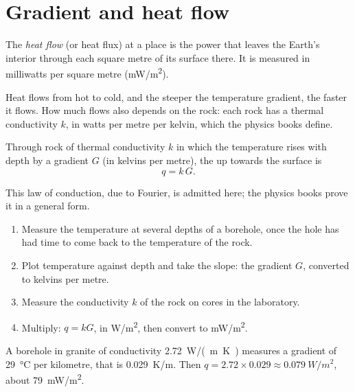 \section{Gradient and heat flow}

\begin{definition}\label{def:g12:internal-heat:heat-flow}
The \emph{heat flow} (or heat flux) at a place is the
power that leaves the Earth's interior through each square metre of its
surface there. It is measured in milliwatts per square metre
(\unit{mW/m^2}).
\end{definition}

Heat flows from hot to cold, and the steeper the temperature gradient, the
faster it flows. How much flows also depends on the rock: each rock has a
thermal conductivity $k$, in watts per metre per kelvin, which the physics
books define.

\begin{proposition}\label{prop:g12:internal-heat:fourier}
Through rock of thermal conductivity $k$ in which the temperature rises with
depth by a gradient $G$ (in kelvins per metre), the  up towards the
surface is
\[
  q = k\,G .
\]
\end{proposition}

This law of conduction, due to Fourier, is admitted here; the physics books
prove it in a general form.

\begin{method}\label{met:g12:internal-heat:borehole}
\begin{enumerate}
  \item Measure the temperature at several depths of a borehole, once the
        hole has had time to come back to the temperature of the rock.
  \item Plot temperature against depth and take the slope: the gradient $G$,
        converted to kelvins per metre.
  \item Measure the conductivity $k$ of the rock on cores in the
        laboratory.
  \item Multiply: $q = kG$, in \unit{W/m^2}, then convert to \unit{mW/m^2}.
\end{enumerate}
\end{method}

\begin{example}\label{ex:g12:internal-heat:borehole}
A borehole in granite of conductivity \qty{2.72}{W/(m.K)} measures a
gradient of \qty{29}{\celsius} per kilometre, that is \qty{0.029}{K/m}.
Then $q = 2.72 \times 0.029 \approx \qty{0.079}{W/m^2}$, about
\qty{79}{mW/m^2}.
\end{example}

